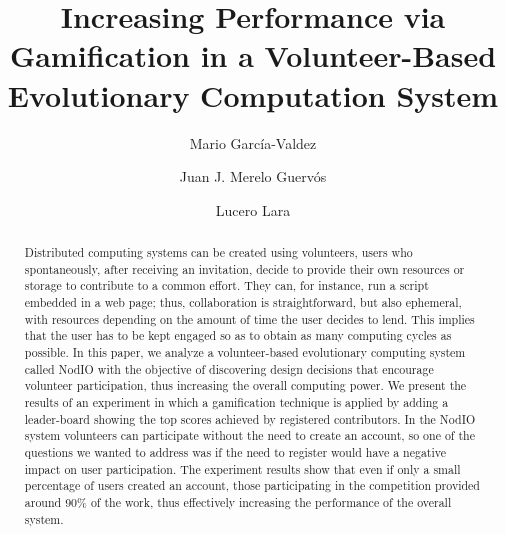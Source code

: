 \documentclass{llncs}
\begin{document}
\sloppy

\title{Increasing Performance via Gamification in a Volunteer-Based Evolutionary Computation System}

\author{Mario Garc\'ia-Valdez \and Juan J. Merelo Guerv\'os \and  Lucero Lara }



\maketitle


\begin{abstract}

Distributed computing systems can be created using volunteers, users who spontaneously, after receiving an invitation, decide to
provide their own resources or storage to contribute to a common
effort. They can, for instance, run a script embedded in a web page;
thus, collaboration is straightforward, but also ephemeral, with
resources depending on the amount of time the user decides to
lend. This implies that the user has to be kept engaged so as to
obtain as many computing cycles as possible. In this paper, we analyze
a volunteer-based evolutionary computing system called  NodIO
 with the objective of discovering design decisions that
encourage volunteer participation, thus increasing the overall
computing power. We present the results of an experiment in which a
gamification technique is applied by adding a leader-board showing the
top scores achieved by registered contributors. In the  NodIO
system volunteers can participate without the need to create
an account, so one of the questions we wanted to address was if the
need to register would have a negative impact on user participation.
The experiment results show that even if only a small percentage of
users created an account, those participating in the competition
provided around 90\% of the work, thus effectively increasing the
performance of the overall system.

\end{abstract}
\end{document}
